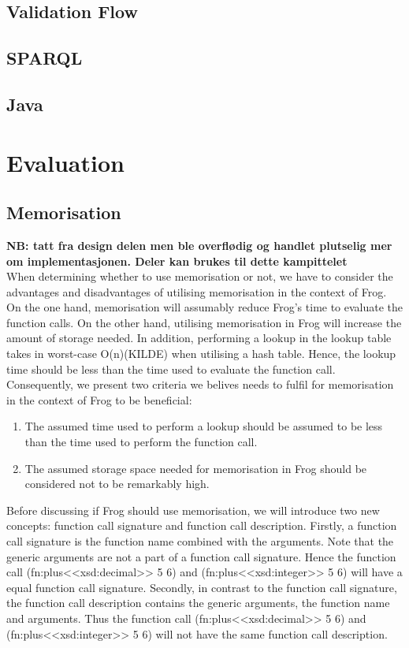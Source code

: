 \subsection{Validation Flow}

\subsection{SPARQL}

\subsection{Java}

\section{Evaluation}
\label{implementation_evaluation}

\subsection{Memorisation}
\textbf{NB: tatt fra design delen men ble overflødig og handlet plutselig mer om implementasjonen. Deler kan brukes til dette kampittelet}
\\
When determining whether to use memorisation or not, we have to consider the advantages and disadvantages of utilising memorisation in the context of Frog. On the one hand, memorisation will assumably reduce Frog's time to evaluate the function calls. On the other hand, utilising memorisation in Frog will increase the amount of storage needed. In addition, performing a lookup in the lookup table takes in worst-case O(n)(KILDE) when utilising a hash table. Hence, the lookup time should be less than the time used to evaluate the function call. Consequently, we present two criteria we belives needs to fulfil for memorisation in the context of Frog to be beneficial:
\begin{enumerate}
    \item The assumed time used to perform a lookup should be assumed to be less than the time used to perform the function call.
    \item The assumed storage space needed for memorisation in Frog should be considered not to be remarkably high. 
\end{enumerate}

\para 
Before discussing if Frog should use memorisation, we will introduce two new concepts: function call signature and function call description. 
Firstly, a function call signature is the function name combined with the arguments. Note that the generic arguments are not a part of a function call signature. Hence the function call (fn:plus<<xsd:decimal>> 5 6) and (fn:plus<<xsd:integer>> 5 6) will have a equal function call signature. Secondly, in contrast to the function call signature, the function call description contains the generic arguments, the function name and arguments. Thus the function call (fn:plus<<xsd:decimal>> 5 6) and (fn:plus<<xsd:integer>> 5 6) will not have the same function call description.

